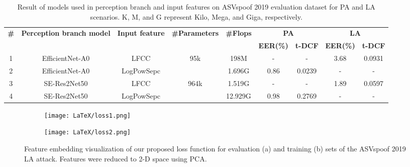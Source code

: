 \documentclass[a4paper]{article}
\begin{document}
\begin{table*}[]
\caption{Result of models used in perception branch and input features on ASVspoof 2019 evaluation dataset for PA and LA scenarios. K, M, and G represent Kilo, Mega, and Giga, respectively. }
\centering
\begin{tabular}{|c|c|c|c|c|c|c|c|c|}
\hline
\multirow{2}{*}{\textbf{\#}} & \multirow{2}{*}{\textbf{Perception branch model}} & \multirow{2}{*}{\textbf{Input feature}} & \multirow{2}{*}{\textbf{\#Parameters}} & \multirow{2}{*}{\textbf{\#Flops}} & \multicolumn{2}{c|}{\textbf{PA}}  & \multicolumn{2}{c|}{\textbf{LA}}  \\ \cline{6-9} 
                             &                                                   &                                         &                                        &                                   & \textbf{EER(\%)} & \textbf{t-DCF} & \textbf{EER(\%)} & \textbf{t-DCF} \\ \hline
1                            & EfficientNet-A0                                   & LFCC                                    & \multirow{2}{*}{95k}                   & 198M                              & -                & -              & 3.68             & 0.0931         \\ \cline{1-3} \cline{5-9} 
2                            & EfficientNet-A0                                   & LogPowSepc                              &                                        & 1.696G                            & 0.86             & 0.0239         & -                & -              \\ \hline
3                            & SE-Res2Net50                                      & LFCC                                    & \multirow{2}{*}{964k}                  & 1.519G                            & -                & -              & 1.89             & 0.0597         \\ \cline{1-3} \cline{5-9} 
4                            & SE-Res2Net50                                      & LogPowSepc                              &                                        & 12.929G                           & 0.98             & 0.2769         & -                & -              \\ \hline
\end{tabular}
\label{tab:PerModelComp}
\end{table*}
\begin{figure}[H]
    \centering
    \begin{subfigure}[b]{0.22\textwidth}
        \centering
        \texttt{[image: LaTeX/loss1.png]}
        \caption{}
    \end{subfigure}
    \hfill
    \begin{subfigure}[b]{0.22\textwidth}
        \centering
        \texttt{[image: LaTeX/loss2.png]}
        \caption{}
    \end{subfigure}
    \hfill
    \caption{Feature embedding visualization of our proposed loss function for evaluation (a) and training (b) sets of the ASVspoof 2019 LA attack. Features were reduced to 2-D space using PCA.}
    \label{fig:lossfunction}
\end{figure}
\end{document}
